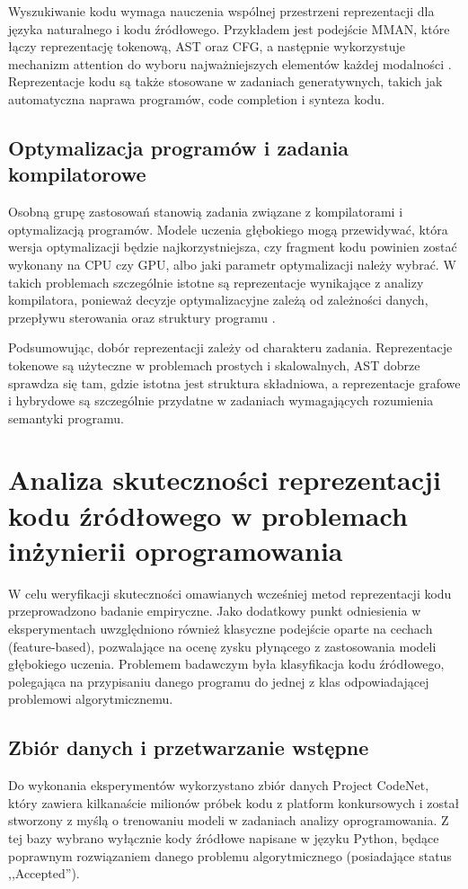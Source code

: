 \documentclass[conference]{IEEEtran}
\begin{document}
Wyszukiwanie kodu wymaga nauczenia wspólnej przestrzeni reprezentacji dla języka naturalnego i kodu źródłowego. Przykładem jest podejście MMAN, które łączy reprezentację tokenową, AST oraz CFG, a następnie wykorzystuje mechanizm attention do wyboru najważniejszych elementów każdej modalności \cite{b4}. Reprezentacje kodu są także stosowane w zadaniach generatywnych, takich jak automatyczna naprawa programów, code completion i synteza kodu.

\subsection{Optymalizacja programów i zadania kompilatorowe}

Osobną grupę zastosowań stanowią zadania związane z kompilatorami i optymalizacją programów. Modele uczenia głębokiego mogą przewidywać, która wersja optymalizacji będzie najkorzystniejsza, czy fragment kodu powinien zostać wykonany na CPU czy GPU, albo jaki parametr optymalizacji należy wybrać. W takich problemach szczególnie istotne są reprezentacje wynikające z analizy kompilatora, ponieważ decyzje optymalizacyjne zależą od zależności danych, przepływu sterowania oraz struktury programu \cite{b5}.

Podsumowując, dobór reprezentacji zależy od charakteru zadania. Reprezentacje tokenowe są użyteczne w problemach prostych i skalowalnych, AST dobrze sprawdza się tam, gdzie istotna jest struktura składniowa, a reprezentacje grafowe i hybrydowe są szczególnie przydatne w zadaniach wymagających rozumienia semantyki programu.

\section{Analiza skuteczności reprezentacji kodu źródłowego w problemach inżynierii oprogramowania}

W celu weryfikacji skuteczności omawianych wcześniej metod reprezentacji kodu przeprowadzono badanie 
empiryczne. Jako dodatkowy punkt odniesienia w eksperymentach uwzględniono również klasyczne podejście 
oparte na cechach (feature-based), pozwalające na ocenę zysku płynącego z zastosowania modeli 
głębokiego uczenia. Problemem badawczym była klasyfikacja kodu źródłowego, polegająca na 
przypisaniu danego programu do jednej z klas odpowiadającej problemowi algorytmicznemu.

\subsection{Zbiór danych i przetwarzanie wstępne}
Do wykonania eksperymentów wykorzystano zbiór danych Project CodeNet, który zawiera kilkanaście milionów 
próbek kodu z platform konkursowych i został stworzony z myślą o trenowaniu modeli w zadaniach analizy 
oprogramowania. Z tej bazy wybrano wyłącznie kody źródłowe napisane w języku Python, będące poprawnym 
rozwiązaniem danego problemu algorytmicznego (posiadające status ,,Accepted'').
\end{document}
